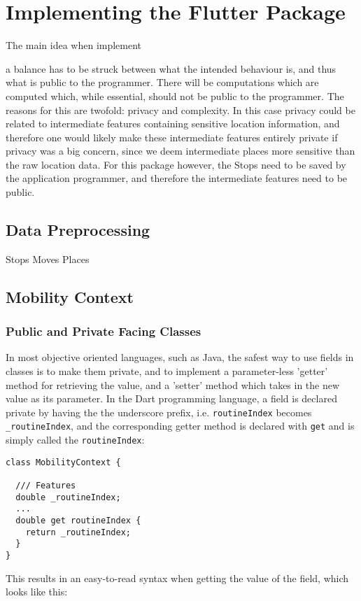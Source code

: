 \section{Implementing the Flutter Package}
The main idea when implement

a balance has to be struck between what the intended behaviour is, and thus what is public to the programmer. There will be computations which are computed which, while essential, should not be public to the programmer. The reasons for this are twofold: privacy and complexity. In this case privacy could be related to intermediate features containing sensitive location information, and therefore one would likely make these intermediate features entirely private if privacy was a big concern, since we deem intermediate places more sensitive than the raw location data. For this package however, the Stops need to be saved by the application programmer, and therefore the intermediate features need to be public. 

\subsection{Data Preprocessing}
Stops Moves Places

\subsection{Mobility Context}
\subsubsection{Public and Private Facing Classes}
In most objective oriented languages, such as Java, the safest way to use fields in classes is to make them private, and to implement a parameter-less 'getter' method for retrieving the value, and a 'setter' method which takes in the new value as its parameter. In the Dart programming language, a field is declared private by having the the underscore prefix, i.e. \verb|routineIndex| becomes \verb|_routineIndex|, and the corresponding getter method is declared with \verb|get| and is simply called the \verb|routineIndex|:

\begin{verbatim}
class MobilityContext {

  /// Features
  double _routineIndex;
  ...
  double get routineIndex {
    return _routineIndex;
  }
}
\end{verbatim}

This results in an easy-to-read syntax when getting the value of the field, which looks like this:


